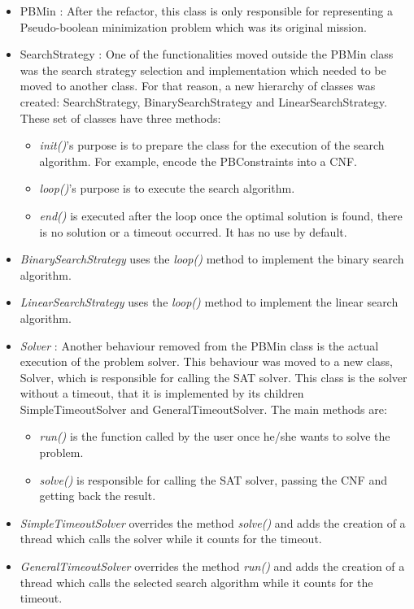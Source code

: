 \begin{itemize}
	\item PBMin : After the refactor, this class is only responsible for representing a Pseudo-boolean minimization problem which was its original mission.
	\item SearchStrategy : One of the functionalities moved outside the PBMin class was the search strategy selection and implementation which needed to be moved to another class. For that reason, a new hierarchy of classes was created: SearchStrategy, BinarySearchStrategy and LinearSearchStrategy.  These set of classes have three methods: 
	\begin{itemize}
		\item \emph{init()}'s purpose is to prepare the class for the execution of the search algorithm. For example, encode the PBConstraints   into a CNF. 
		\item \emph{loop()}'s purpose is to execute the search algorithm.  
		\item \emph{end()} is executed after the loop once the optimal solution is found, there is no solution or a timeout occurred. It has no use by default.  
	\end{itemize}
	\item \emph{BinarySearchStrategy} uses the \emph{loop()} method to implement the binary search algorithm. 
	\item \emph{LinearSearchStrategy} uses the \emph{loop()} method to implement the linear search algorithm. 
	\item \emph{Solver} : Another behaviour removed from the PBMin class is the actual execution of the problem solver. This behaviour was moved to a new class, Solver, which is responsible for calling the SAT solver. This class is the solver without a timeout, that it is implemented by its children SimpleTimeoutSolver and GeneralTimeoutSolver. The main methods are: 
	\begin{itemize}
		\item \emph{run()} is the function called by the user once he/she wants to solve the problem.
		\item \emph{solve()} is responsible for calling the SAT solver, passing the CNF and getting back the result. 
	\end{itemize}
	\item \emph{SimpleTimeoutSolver} overrides the method \emph{solve()} and adds the creation of a thread which calls the solver while it counts for the timeout.  
	\item \emph{GeneralTimeoutSolver} overrides the method \emph{run()} and adds the creation of a thread which calls the selected search algorithm while it counts for the timeout. 
\end{itemize}  


